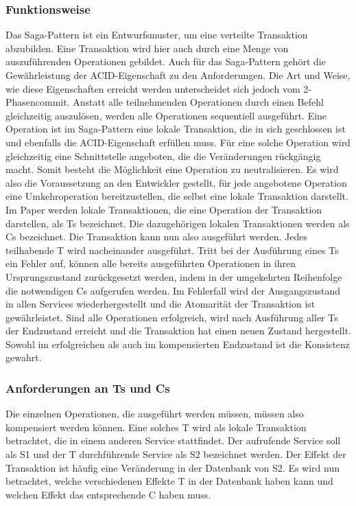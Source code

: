 \subsubsection{Funktionsweise}
Das Saga-Pattern ist ein Entwurfsmuster, um eine verteilte Transaktion abzubilden. Eine Transaktion wird hier auch durch eine Menge von auszuführenden Operationen gebildet. Auch für das Saga-Pattern gehört die Gewährleistung der ACID-Eigenschaft zu den Anforderungen. Die Art und Weise, wie diese Eigenschaften erreicht werden unterscheidet sich jedoch vom 2-Phasencommit. 
Anstatt alle teilnehmenden Operationen durch einen Befehl gleichzeitig auszulösen, werden alle Operationen sequentiell ausgeführt. Eine Operation ist im Saga-Pattern eine lokale Transaktion, die in sich geschlossen ist und ebenfalls die ACID-Eigenschaft erfüllen muss. Für eine solche Operation wird gleichzeitig eine Schnittstelle angeboten, die die Veränderungen rückgängig macht. Somit besteht die Möglichkeit eine Operation zu neutralisieren. Es wird also die Voraussetzung an den Entwickler gestellt, für jede angebotene Operation eine Umkehroperation bereitzustellen, die selbst eine lokale Transaktion darstellt. 
Im Paper werden lokale Transaktionen, die eine Operation der Transaktion darstellen, als Ts bezeichnet. Die dazugehörigen lokalen Transaktionen werden als Cs bezeichnet. 
Die Transaktion kann nun also ausgeführt werden. Jedes teilhabende T wird nacheinander ausgeführt. Tritt bei der Ausführung eines Ts ein Fehler auf, können alle bereits ausgeführten Operationen in ihren Ursprungszustand zurückgesetzt werden, indem in der umgekehrten Reihenfolge die notwendigen Cs aufgerufen werden. Im Fehlerfall wird der Ausgangszustand in allen Services wiederhergestellt und die Atomarität der Transaktion ist gewährleistet. Sind alle Operationen erfolgreich, wird nach Ausführung aller Ts der Endzustand erreicht und die Transaktion hat einen neuen Zustand hergestellt. Sowohl im erfolgreichen als auch im kompensierten Endzustand ist die Konsistenz gewahrt.

\subsubsection{Anforderungen an Ts und Cs}
Die einzelnen Operationen, die ausgeführt werden müssen, müssen also kompensiert werden können. Eine solches T wird als lokale Transaktion betrachtet, die in einem anderen Service stattfindet. Der aufrufende Service soll als S1 und der T durchführende Service als S2 bezeichnet werden. Der Effekt der Transaktion ist häufig eine Veränderung in der Datenbank von S2. Es wird nun betrachtet, welche verschiedenen Effekte T in der Datenbank haben kann und welchen Effekt das entsprechende C haben muss.

